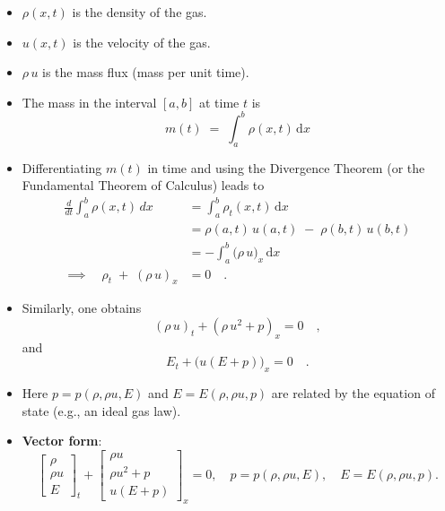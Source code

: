 \begin{itemize}
  \item \(\rho(x,t)\) is the density of the gas.
  \item \(u(x,t)\) is the velocity of the gas.
  \item \(\rho\,u\) is the mass flux (mass per unit time).
  \item The mass in the interval \([a,b]\) at time \(t\) is
        \[
          m(t) \;=\; \int_a^b \rho(x,t)\,\mathrm{d}x
        \]
  \item Differentiating \(m(t)\) in time and using the Divergence Theorem (or the Fundamental Theorem of Calculus) leads to
        \begin{align*}
          \frac{d}{dt}\int_{a}^{b} \rho(x,t)\,dx
                                   & = \int_a^b \rho_t(x,t)\,\mathrm{d}x              \\
                                   & = \rho(a,t)\,u(a,t) \;-\; \rho(b,t)\,u(b,t)      \\
                                   & = - \int_a^b \bigl(\rho\,u\bigr)_x \,\mathrm{d}x
          \\
          \implies \quad
          \rho_t \;+\; (\rho\,u)_x & = 0
          \quad\tag{Conservation of mass}.
        \end{align*}
  \item Similarly, one obtains
        \[
          (\rho\,u)_t + (\rho\,u^2 + p)_x = 0
          \quad\tag{Conservation of momentum},
        \]
        and
        \[
          E_t + \bigl(u(E + p)\bigr)_x = 0
          \quad\tag{Conservation of energy}.
        \]
  \item Here \(p = p(\rho,\rho u,E)\) and \(E = E(\rho,\rho u,p)\) are related by the equation of state (e.g., an ideal gas law).
  \item \textbf{Vector form}:
        \[
          \begin{bmatrix}
            \rho   \\
            \rho u \\
            E
          \end{bmatrix}_t
          +
          \begin{bmatrix}
            \rho u       \\
            \rho u^2 + p \\
            u(E + p)
          \end{bmatrix}_x
          = 0,
          \quad
          p = p(\rho,\rho u,E),\quad
          E = E(\rho,\rho u,p).
        \]
\end{itemize}

